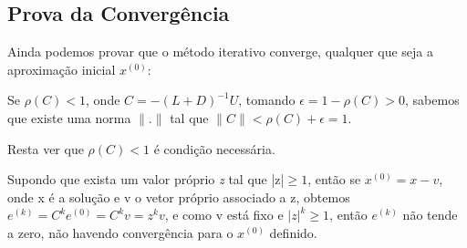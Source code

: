 \documentclass[10pt,a4paper]{article}
\begin{document}
\subsection*{Prova da Convergência}
    Ainda podemos provar que o método iterativo converge, qualquer que seja a aproximação inicial $x^{(0)}$:

    Se $\rho(C)<1$, onde $C = -(L+D)^{-1}U$, tomando $\epsilon=1-\rho(C)>0$, sabemos que existe uma norma $\| . \|$ tal que $\| C\| < \rho(C) + \epsilon=1$.

    Resta ver que $\rho(C)<1$ é condição necessária.

    Supondo que exista um valor próprio \textit{z} tal que |z|$\geq 1$, então se $x^{(0)}=x-v$, onde x é a solução e v o vetor próprio associado a z, obtemos $e^{(k)}=C^k e^{(0)}=C^kv=z^kv$, e como v está fixo e $|z|^k\geq 1$, então $e^{(k)}$ não tende a zero, não havendo convergência para o $x^{(0)}$ definido.
\end{document}
